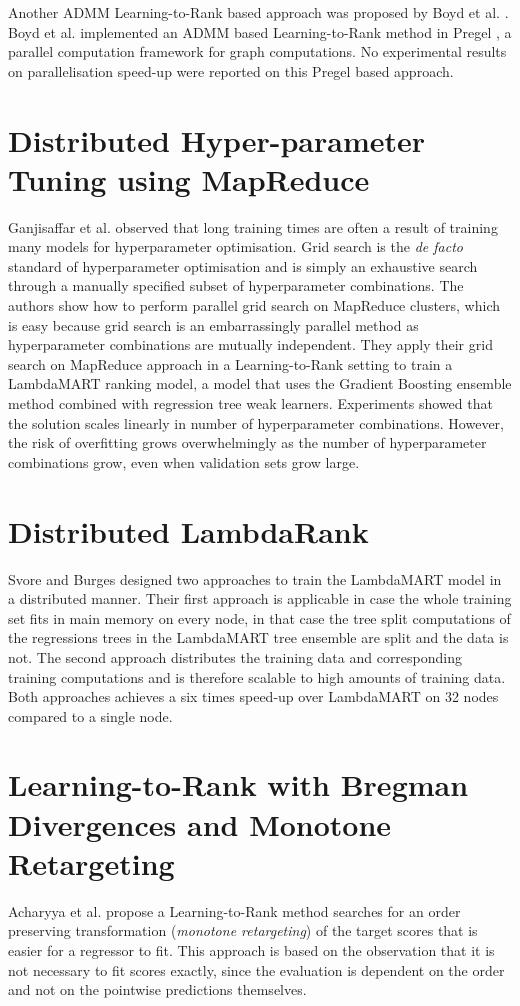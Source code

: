 Another \ac{ADMM} Learning-to-Rank based approach was proposed by Boyd et al. \cite{Boyd2012}. Boyd et al. \cite{Boyd2012} implemented an \ac{ADMM} based Learning-to-Rank method in Pregel \cite{Malewicz2010}, a parallel computation framework for graph computations. No experimental results on parallelisation speed-up were reported on this Pregel based approach.
\section{Distributed Hyper-parameter Tuning using MapReduce}
Ganjisaffar et al. \cite{Ganjisaffar2011} observed that long training times are often a result of training many models for hyperparameter optimisation. Grid search is the \emph{de facto} standard of hyperparameter optimisation and is simply an exhaustive search through a manually specified subset of hyperparameter combinations. The authors show how to perform parallel grid search on MapReduce clusters, which is easy because grid search is an embarrassingly parallel method as hyperparameter combinations are mutually independent. They apply their grid search on MapReduce approach in a Learning-to-Rank setting to train a LambdaMART \cite{Wu2008} ranking model, a model that uses the Gradient Boosting \cite{Friedman2002} ensemble method combined with regression tree weak learners. Experiments showed that the solution scales linearly in number of hyperparameter combinations. However, the risk of overfitting grows overwhelmingly as the number of hyperparameter combinations grow, even when validation sets grow large.
\section{Distributed LambdaRank}
Svore and Burges \cite{Svore2010,Svore2012} designed two approaches to train the LambdaMART \cite{Wu2008} model in a distributed manner. Their first approach is applicable in case the whole training set fits in main memory on every node, in that case the tree split computations of the regressions trees in the LambdaMART tree ensemble are split and the data is not. The second approach distributes the training data and corresponding training computations and is therefore scalable to high amounts of training data. Both approaches achieves a six times speed-up over LambdaMART on 32 nodes compared to a single node.
\section{Learning-to-Rank with Bregman Divergences and Monotone Retargeting}
Acharyya et al. \cite{Acharyya2012} propose a Learning-to-Rank method searches for an order preserving transformation (\emph{monotone retargeting}) of the target scores that is easier for a regressor to fit. This approach is based on the observation that it is not necessary to fit scores exactly, since the evaluation is dependent on the order and not on the pointwise predictions themselves.\\

